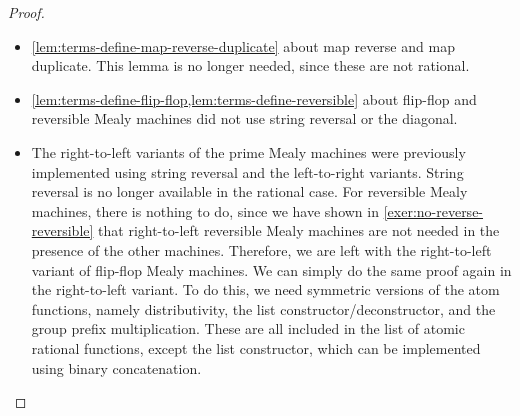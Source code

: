 \begin{proof}
\begin{itemize}
    \item    \cref{lem:terms-define-map-reverse-duplicate} about map reverse and map duplicate. This lemma is no longer needed, since these are not rational. 
    \item  \cref{lem:terms-define-flip-flop,lem:terms-define-reversible} about flip-flop and reversible Mealy machines did not use string reversal or the diagonal. 
    \item The right-to-left variants of the prime Mealy machines were previously implemented using string reversal and the left-to-right variants. String reversal is no longer available in the rational case. For reversible Mealy machines, there is nothing to do, since we have shown in \cref{exer:no-reverse-reversible} that right-to-left reversible Mealy machines are not needed in the presence of the other machines. Therefore, we are left with the right-to-left variant of flip-flop Mealy machines.  We can simply do the same proof again in the right-to-left variant. To do this, we need symmetric versions of the atom functions, namely distributivity, the list constructor/deconstructor, and the group prefix multiplication. These are all included in the list of atomic rational functions, except the list constructor, which can be implemented using binary concatenation. 
\end{itemize}

\end{proof}


\exerciseheader



